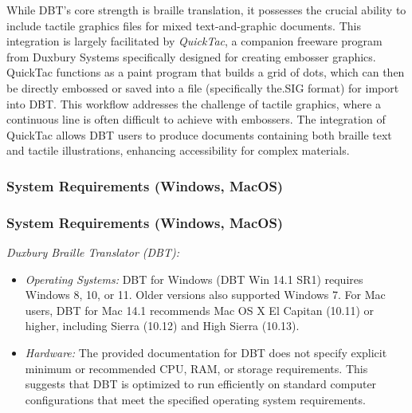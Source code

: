 While DBT's core strength is braille translation, it possesses the crucial ability to include tactile graphics files for mixed text-and-graphic documents. \cite{TouchMapper,PerkinsTouchMapper,ElitaElPicsPrint} This integration is largely facilitated by \emph{QuickTac}, a companion freeware program from Duxbury Systems specifically designed for creating embosser graphics. \cite{TouchMapper,ElitaElPicsPrint,ViewplusTSS,DuxburyDetails,SoftorageInkscape} QuickTac functions as a paint program that builds a grid of dots, which can then be directly embossed or saved into a file (specifically the.SIG format) for import into DBT. \cite{TouchMapper,DuxburyDetails} This workflow addresses the challenge of tactile graphics, where a continuous line is often difficult to achieve with embossers. \cite{ViewplusTSS} The integration of QuickTac allows DBT users to produce documents containing both braille text and tactile illustrations, enhancing accessibility for complex materials. \cite{TouchMapper,DuxburyDetails,PerkinsTouchMapper,ElitaElPicsPrint}

\subsubsection{System Requirements (Windows, MacOS)}

\subsubsection{System Requirements (Windows, MacOS)}

\emph{Duxbury Braille Translator (DBT):}
\begin{itemize}
    \item \emph{Operating Systems:} DBT for Windows (DBT Win 14.1 SR1) requires Windows 8, 10, or 11. \cite{PerkinsTouchMapper,IrieBrailleTrac,ElitaElPicsPrint} Older versions also supported Windows 7. \cite{ElitaElPicsPrint} For Mac users, DBT for Mac 14.1 recommends Mac OS X El Capitan (10.11) or higher, including Sierra (10.12) and High Sierra (10.13). \cite{IrieBrailleTrac,ElitaElPicsPrint}
    \item \emph{Hardware:} The provided documentation for DBT does not specify explicit minimum or recommended CPU, RAM, or storage requirements. \cite{PerkinsTouchMapper,ViewplusTSS,IrieBrailleTrac,ElitaElPicsPrint,DuxburyDetails} This suggests that DBT is optimized to run efficiently on standard computer configurations that meet the specified operating system requirements.
\end{itemize}

